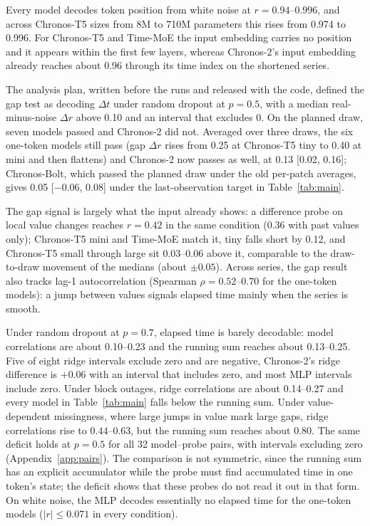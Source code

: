 \documentclass{article}
\newcommand{\dt}{\Delta t}
\begin{document}
Every model decodes token position from white noise at $r = 0.94$--$0.996$, and across Chronos-T5 sizes from 8M to 710M parameters this rises from 0.974 to 0.996.
For Chronos-T5 and Time-MoE the input embedding carries no position and it appears within the first few layers, whereas Chronos-2's input embedding already reaches about 0.96 through its time index on the shortened series.

The analysis plan, written before the runs and released with the code, defined the gap test as decoding $\dt$ under random dropout at $p = 0.5$, with a median real-minus-noise $\Delta r$ above 0.10 and an interval that excludes 0.
On the planned draw, seven models passed and Chronos-2 did not.
Averaged over three draws, the six one-token models still pass (gap $\Delta r$ rises from 0.25 at Chronos-T5 tiny to 0.40 at mini and then flattens) and Chronos-2 now passes as well, at 0.13 [0.02, 0.16]; Chronos-Bolt, which passed the planned draw under the old per-patch averages, gives 0.05 [$-0.06$, 0.08] under the last-observation target in Table~\ref{tab:main}.

The gap signal is largely what the input already shows: a difference probe on local value changes reaches $r = 0.42$ in the same condition (0.36 with past values only); Chronos-T5 mini and Time-MoE match it, tiny falls short by 0.12, and Chronos-T5 small through large sit 0.03--0.06 above it, comparable to the draw-to-draw movement of the medians (about $\pm 0.05$).
Across series, the gap result also tracks lag-1 autocorrelation (Spearman $\rho = 0.52$--$0.70$ for the one-token models): a jump between values signals elapsed time mainly when the series is smooth.

Under random dropout at $p = 0.7$, elapsed time is barely decodable: model correlations are about 0.10--0.23 and the running sum reaches about 0.13--0.25.
Five of eight ridge intervals exclude zero and are negative, Chronos-2's ridge difference is $+0.06$ with an interval that includes zero, and most MLP intervals include zero.
Under block outages, ridge correlations are about 0.14--0.27 and every model in Table~\ref{tab:main} falls below the running sum.
Under value-dependent missingness, where large jumps in value mark large gaps, ridge correlations rise to $0.44$--$0.63$, but the running sum reaches about 0.80.
The same deficit holds at $p = 0.5$ for all 32 model--probe pairs, with intervals excluding zero (Appendix~\ref{app:pairs}).
The comparison is not symmetric, since the running sum has an explicit accumulator while the probe must find accumulated time in one token's state; the deficit shows that these probes do not read it out in that form.
On white noise, the MLP decodes essentially no elapsed time for the one-token models ($|r| \le 0.071$ in every condition).
\end{document}
